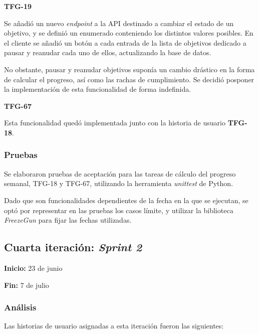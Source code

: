 \documentclass[10pt, a4paper]{aqademic}
\begin{document}
\medskip

\textbf{TFG-19}

Se añadió un nuevo \textit{endpoint} a la API destinado a cambiar el estado de un objetivo, y se definió un enumerado conteniendo los distintos valores posibles. En el cliente se añadió un botón a cada entrada de la lista de objetivos dedicado a pausar y reanudar cada uno de ellos, actualizando la base de datos.

No obstante, pausar y reanudar objetivos suponía un cambio drástico en la forma de calcular el progreso, así como las rachas de cumplimiento. Se decidió posponer la implementación de esta funcionalidad de forma indefinida.

\medskip

\textbf{TFG-67}

Esta funcionalidad quedó implementada junto con la historia de usuario \textbf{TFG-18}.


\subsubsection{Pruebas}

Se elaboraron pruebas de aceptación para las tareas de cálculo del progreso semanal, TFG-18 y TFG-67, utilizando la herramienta \textit{unittest} de Python.

Dado que son funcionalidades dependientes de la fecha en la que se ejecutan, se optó por representar en las pruebas los casos límite, y utilizar la biblioteca \textit{FreezeGun} \cite{pulec_freezegun_nodate} para fijar las fechas utilizadas.


\subsection{Cuarta iteración: \textit{Sprint 2}}

\textbf{Inicio:} 23 de junio

\textbf{Fin:} 7 de julio

\subsubsection{Análisis}

Las historias de usuario asignadas a esta iteración fueron las siguientes:
\end{document}
